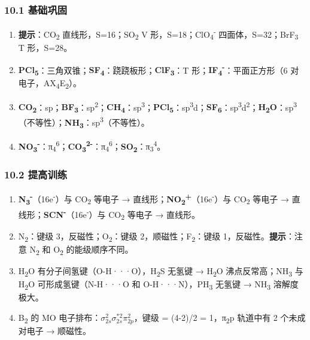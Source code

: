 \documentclass[a4paper,11pt]{ctexart}
\begin{document}
\subsubsection{10.1 基础巩固}\label{ux57faux7840ux5de9ux56fa-1}

\begin{enumerate}
\def\labelenumi{\arabic{enumi}.}
\item
  \textbf{提示}：CO\textsubscript{2} 直线形，S=16；SO\textsubscript{2} V 形，S=18；ClO\textsubscript{4}\textsuperscript{-} 四面体，S=32；BrF\textsubscript{3} T 形，S=28。
\item
  \textbf{PCl\textsubscript{5}}：三角双锥；\textbf{SF\textsubscript{4}}：跷跷板形；\textbf{ClF\textsubscript{3}}：T 形；\textbf{IF\textsubscript{4}\textsuperscript{-}}：平面正方形（6 对电子，AX\textsubscript{4}E\textsubscript{2}）。
\item
  \textbf{CO\textsubscript{2}}：sp；\textbf{BF\textsubscript{3}}：sp\textsuperscript{2}；\textbf{CH\textsubscript{4}}：sp\textsuperscript{3}；\textbf{PCl\textsubscript{5}}：sp\textsuperscript{3}d；\textbf{SF\textsubscript{6}}：sp\textsuperscript{3}d\textsuperscript{2}；\textbf{H\textsubscript{2}O}：sp\textsuperscript{3}（不等性）；\textbf{NH\textsubscript{3}}：sp\textsuperscript{3}（不等性）。
\item
  \textbf{NO\textsubscript{3}\textsuperscript{-}}：π\textsubscript{4}\textsuperscript{6}；\textbf{CO\textsubscript{3}\textsuperscript{2-}}：π\textsubscript{4}\textsuperscript{6}；\textbf{SO\textsubscript{2}}：π\textsubscript{3}\textsuperscript{4}。
\end{enumerate}

\subsubsection{10.2 提高训练}\label{ux63d0ux9ad8ux8badux7ec3-1}

\begin{enumerate}
\def\labelenumi{\arabic{enumi}.}
\setcounter{enumi}{4}
\item
  \textbf{N\textsubscript{3}\textsuperscript{-}}（16e\textsuperscript{-}）与 CO\textsubscript{2} 等电子 → 直线形；\textbf{NO\textsubscript{2}\textsuperscript{+}}（16e\textsuperscript{-}）与 CO\textsubscript{2} 等电子 → 直线形；\textbf{SCN\textsuperscript{-}}（16e\textsuperscript{-}）与 CO\textsubscript{2} 等电子 → 直线形。
\item
  N\textsubscript{2}：键级 3，反磁性；O\textsubscript{2}：键级 2，顺磁性；F\textsubscript{2}：键级 1，反磁性。\textbf{提示}：注意 N\textsubscript{2} 和 O\textsubscript{2} 的能级顺序不同。
\item
  H\textsubscript{2}O 有分子间氢键（O-H···O），H\textsubscript{2}S 无氢键 → H\textsubscript{2}O 沸点反常高；NH\textsubscript{3} 与 H\textsubscript{2}O 可形成氢键（N-H···O 和 O-H···N），PH\textsubscript{3} 无氢键 → NH\textsubscript{3} 溶解度极大。
\item
  B\textsubscript{2} 的 MO 电子排布：\(\sigma_{2s}^2 \sigma_{2s}^{*2} \pi_{2p}^2\)，键级 = (4-2)/2 = 1，π\textsubscript{2}p 轨道中有 2 个未成对电子 → 顺磁性。
\end{enumerate}
\end{document}
